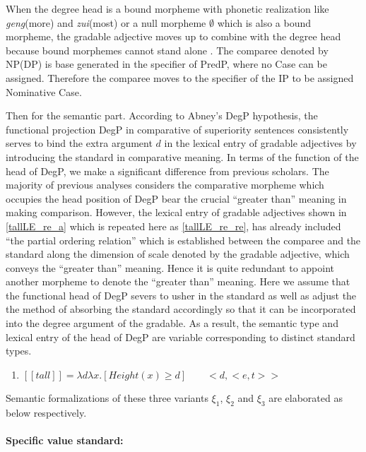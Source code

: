 \documentclass{ctexart}
\let \cite \parencite
\begin{document}
When the degree head is a bound morpheme with phonetic realization like \textit{geng}(more) and \textit{zui}(most) or a null morpheme $\emptyset$ which is also a bound morpheme, the gradable adjective moves up to combine with the degree head because bound morphemes cannot stand alone \cite{hebook}. The comparee denoted by NP(DP) is base generated in the specifier of PredP, where no Case can be assigned. Therefore the comparee moves to the specifier of the IP to be assigned Nominative Case. 

Then for the semantic part. According to Abney's DegP hypothesis, the functional projection DegP in comparative of superiority sentences consistently serves to bind the extra argument $d$ in the lexical entry of gradable adjectives by introducing the standard in comparative meaning. In terms of the function of the head of DegP, we make a significant  difference from previous scholars. The majority of previous analyses \cite{von1984a,bale2008} considers the comparative morpheme which occupies the head position of DegP bear the crucial ``greater than'' meaning in making comparison. However, the lexical entry of gradable adjectives shown in \ref{tallLE_re_a} which is repeated here as \ref{tallLE_re_re}, has already included ``the partial ordering relation'' which is established between the comparee and the standard along the dimension of scale denoted by the gradable adjective, which conveys the ``greater than'' meaning. Hence it is quite redundant to appoint another morpheme to denote the ``greater than'' meaning.  Here we assume that the functional head of DegP severs to usher in the standard as well as adjust the the method of absorbing the standard accordingly so that it can be incorporated into the degree argument of the gradable. As a result, the semantic type and lexical entry of the head of DegP are variable corresponding to distinct standard types.

\begin{enumerate}
    \item \label{tallLE_re_re}
    $[\![tall]\!]=\lambda d \lambda x.[Height(x) \geq d] \qquad <d,<e,t>>$
\end{enumerate}

Semantic formalizations of these three variants $\xi_1$, $\xi_2$ and $\xi_3$ are elaborated as below respectively.

\paragraph{Specific value standard:}
\end{document}
